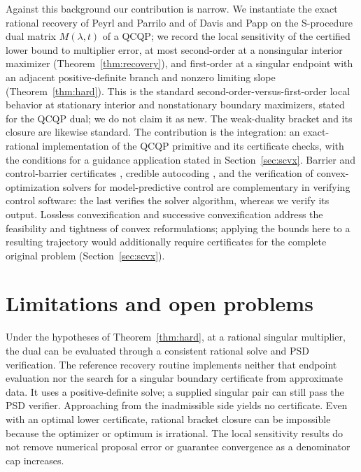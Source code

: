 \documentclass[11pt]{article}
\theoremstyle{plain}
\theoremstyle{remark}
\begin{document}
Against this background our contribution is narrow. We instantiate the exact
rational recovery of Peyrl and Parrilo and of Davis and Papp on the S-procedure
dual matrix $M(\lambda,t)$ of a QCQP; we record the local sensitivity of the
certified lower bound to multiplier error, at most second-order at a
nonsingular interior maximizer (Theorem~\ref{thm:recovery}), and first-order
at a singular endpoint with an adjacent positive-definite branch and nonzero
limiting slope (Theorem~\ref{thm:hard}). This is the standard second-order-versus-first-order
local behavior at stationary interior and nonstationary boundary maximizers,
stated for the QCQP dual; we do not claim it as new. The weak-duality bracket and its
closure are likewise standard. The contribution is the integration: an
exact-rational implementation of the QCQP primitive and its certificate checks,
with the conditions for a guidance application stated in
Section~\ref{sec:scvx}. Barrier and control-barrier
certificates \cite{prajna2004,ames2017}, credible autocoding \cite{feron2013},
and the verification of convex-optimization solvers for model-predictive control
\cite{cohen2020} are complementary in verifying control software: the last
verifies the solver algorithm, whereas we verify its output. Lossless
convexification \cite{acikmese2011} and successive convexification
\cite{elango2025} address the feasibility and tightness of convex reformulations;
applying the bounds here to a resulting trajectory would additionally require
certificates for the complete original problem (Section~\ref{sec:scvx}).

\section{Limitations and open problems}
\label{sec:limits}

Under the hypotheses of Theorem~\ref{thm:hard}, at a rational singular multiplier,
the dual can be evaluated through a consistent rational solve and PSD verification. The
reference recovery routine implements neither that endpoint evaluation nor
the search for a singular boundary certificate from approximate data.
It uses a positive-definite solve; a supplied singular pair can still pass the
PSD verifier. Approaching from the inadmissible side yields no certificate. Even with an optimal lower
certificate, rational bracket closure can be impossible because the optimizer
or optimum is irrational. The local sensitivity results do not remove numerical
proposal error or guarantee convergence as a denominator cap increases.
\end{document}
